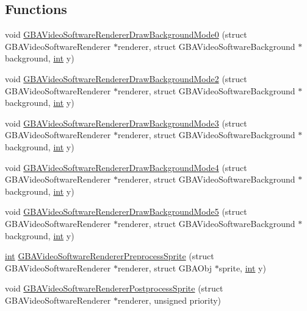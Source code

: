 \subsection*{Functions}
\begin{DoxyCompactItemize}
\item 
void \mbox{\hyperlink{software-private_8h_aa2ad56e185c8e2391b4fd6bbc6835e22}{G\+B\+A\+Video\+Software\+Renderer\+Draw\+Background\+Mode0}} (struct G\+B\+A\+Video\+Software\+Renderer $\ast$renderer, struct G\+B\+A\+Video\+Software\+Background $\ast$background, \mbox{\hyperlink{ioapi_8h_a787fa3cf048117ba7123753c1e74fcd6}{int}} y)
\item 
void \mbox{\hyperlink{software-private_8h_a857093ab69d7c97954123b68e1cb57ae}{G\+B\+A\+Video\+Software\+Renderer\+Draw\+Background\+Mode2}} (struct G\+B\+A\+Video\+Software\+Renderer $\ast$renderer, struct G\+B\+A\+Video\+Software\+Background $\ast$background, \mbox{\hyperlink{ioapi_8h_a787fa3cf048117ba7123753c1e74fcd6}{int}} y)
\item 
void \mbox{\hyperlink{software-private_8h_a5f6c2be8bd7b2cede91d2b562d7c34a9}{G\+B\+A\+Video\+Software\+Renderer\+Draw\+Background\+Mode3}} (struct G\+B\+A\+Video\+Software\+Renderer $\ast$renderer, struct G\+B\+A\+Video\+Software\+Background $\ast$background, \mbox{\hyperlink{ioapi_8h_a787fa3cf048117ba7123753c1e74fcd6}{int}} y)
\item 
void \mbox{\hyperlink{software-private_8h_a0877e6bb6557f6b7069843bd995a3bce}{G\+B\+A\+Video\+Software\+Renderer\+Draw\+Background\+Mode4}} (struct G\+B\+A\+Video\+Software\+Renderer $\ast$renderer, struct G\+B\+A\+Video\+Software\+Background $\ast$background, \mbox{\hyperlink{ioapi_8h_a787fa3cf048117ba7123753c1e74fcd6}{int}} y)
\item 
void \mbox{\hyperlink{software-private_8h_aa15bd912d55150946d944ab1ea4d457f}{G\+B\+A\+Video\+Software\+Renderer\+Draw\+Background\+Mode5}} (struct G\+B\+A\+Video\+Software\+Renderer $\ast$renderer, struct G\+B\+A\+Video\+Software\+Background $\ast$background, \mbox{\hyperlink{ioapi_8h_a787fa3cf048117ba7123753c1e74fcd6}{int}} y)
\item 
\mbox{\hyperlink{ioapi_8h_a787fa3cf048117ba7123753c1e74fcd6}{int}} \mbox{\hyperlink{software-private_8h_a1f995eed921e1b4e0963fab4daf5e2da}{G\+B\+A\+Video\+Software\+Renderer\+Preprocess\+Sprite}} (struct G\+B\+A\+Video\+Software\+Renderer $\ast$renderer, struct G\+B\+A\+Obj $\ast$sprite, \mbox{\hyperlink{ioapi_8h_a787fa3cf048117ba7123753c1e74fcd6}{int}} y)
\item 
void \mbox{\hyperlink{software-private_8h_a47b212d8fd0ffc36105a78d71946516b}{G\+B\+A\+Video\+Software\+Renderer\+Postprocess\+Sprite}} (struct G\+B\+A\+Video\+Software\+Renderer $\ast$renderer, unsigned priority)

\end{DoxyCompactItemize}
